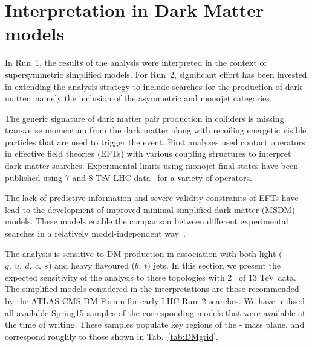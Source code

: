 \section{Interpretation in Dark Matter models} \label{sec:darkmatter}

In Run~1, the results of the \alphat analysis were interpreted in the context of
supersymmetric simplified models. For Run~2, significant effort has been invested
in extending the analysis strategy to include searches for the production of dark
matter, namely the inclusion of the asymmetric and monojet categories.

The generic signature of dark matter pair production in colliders is missing
transverse momentum from the dark matter along with recoiling energetic visible
particles that are used to trigger the event. First analyses used contact 
operators~\cite{Goodman:2010ku} in effective field theories (EFTs) with various 
coupling structures to interpret dark matter searches. Experimental limits using
monojet final states have been published using 7 and 8 TeV LHC 
data~\cite{Chatrchyan:2012me,ATLAS:2012ky} for a variety of operators.


The lack of predictive information and severe validity constraints of EFTs have
lead to the development of improved minimal simplified dark matter (MSDM) models.
These models enable the comparison between different experimental
searches in a relatively model-independent way~\cite{Buchmueller:2014yoa}.


The \alphat analysis is sensitive to DM production in association with both
light ($g,~u,~d,~c,~s$) and heavy flavoured ($b,~t$) jets. In this section we
present the expected sensitivity of the analysis to these topologies with 2~\ifb
of 13 TeV data. The simplified models considered in the interpretations are those
recommended by the ATLAS-CMS DM Forum for early LHC Run~2 searches. We have
utilised all available Spring15 samples of the corresponding models that were
available at the time of writing. These samples populate key regions of the
{\mphi-\mchi} mass plane, and correspond roughly to those shown in
Tab.~\ref{tab:DMgrid}.

